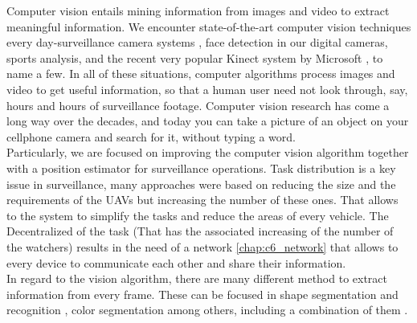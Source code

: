Computer vision entails mining information from images and video to extract meaningful information. We encounter state-of-the-art computer vision techniques every day-surveillance camera systems \cite{traffic_surveillance_pergamon} \cite{distributed_surveillance} \cite{vehicle_detection}, face detection in our digital cameras, sports analysis, and the recent very popular Kinect system by Microsoft \cite{Kinect_intro}, to name a few. In all of these situations, computer algorithms process images and video to get useful information, so that a human user need not look through, say, hours and hours of surveillance footage. Computer vision research has come a long way over the decades, and today you can take a picture of an object on your cellphone camera and search for it, without typing a word. \\

Particularly, we are focused on improving the computer vision algorithm together with a position estimator for surveillance operations. Task distribution \cite{Coop_Surv_aerial_JJ} \cite{Consensus_reaching_Xiao} \cite{Adaptative_tast_Meuth} \cite{distributed_architecture_Ivan_Maza}  is a key issue in surveillance, many approaches were based on reducing the size and the requirements of the UAVs but increasing the number of these ones. That allows to the system to simplify the tasks and reduce the areas of every vehicle. The Decentralized of the task \cite{descentralized_task_UAV} (That has the associated increasing of the number of the watchers) results in the need of a network \ref{chap:c6_network} that allows to every device to communicate each other and share their information. \\

In regard to the vision algorithm, there are many different method to extract information from every frame. These can be focused in shape segmentation and recognition \cite{shape_using_shape_context} \cite{Vehicle_recog_markov}, color segmentation \cite{} among others, including a combination of them \cite{realtime_signal_recon_shape_color} \cite{signal_recogn_shape_color} \cite{Robust_RT_tracking_color_face_Darrell}.


